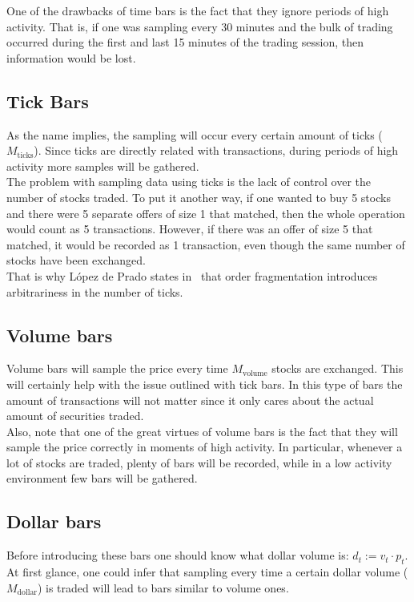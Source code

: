 One of the drawbacks of time bars is the fact that they ignore periods of 
high activity. That is, if one was sampling every 30 minutes and the bulk of 
trading occurred during the first and last 15 minutes of the trading 
session, then information would be lost.

\subsection*{Tick Bars}
As the name implies, the sampling will occur every certain amount of ticks 
($M_{\text{ticks}}$). Since ticks are directly related with transactions, 
during periods of high activity more samples will be gathered.\\

The problem with sampling data using ticks is the lack of control over the 
number of stocks traded. To put it another way, if one wanted to buy 5 
stocks and there were 5 separate offers of size 1 that matched, then the 
whole operation would count as 5 transactions. However, if there was an offer 
of size 5 that matched, it would be recorded as 1 transaction, even though 
the same number of stocks have been exchanged.\\

That is why López de Prado states in~\cite{AdvFML} that order fragmentation 
introduces arbitrariness in the number of ticks.

\subsection*{Volume bars}
Volume bars will sample the price every time $M_{\text{volume}}$ stocks are 
exchanged. This will certainly help with the issue outlined with tick bars. 
In this type of bars the amount of transactions will not matter since it 
only cares about the actual amount of securities traded.\\

Also, note that one of the great virtues of volume bars is the fact that 
they will sample the price correctly in moments of high activity. In 
particular, whenever a lot of stocks are traded, plenty of bars will be 
recorded, while in a low activity environment few bars will be gathered.

\subsection*{Dollar bars}
Before introducing these bars one should know what dollar volume is: 
$d_t := v_t \cdot p_t$. At first glance, one could infer that sampling every 
time a certain dollar volume ($M_{\text{dollar}}$) is traded will lead to 
bars similar to volume ones.\\

